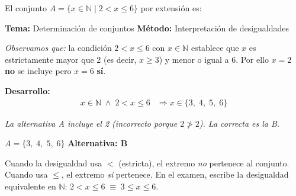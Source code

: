 \begin{tcolorbox}[
  enhanced, breakable,
  colback=GrisClaro, colframe=AzulPizarra,
  fonttitle=\bfseries\sffamily,
  title={Ejercicio 3 --- Nivel B\'asico},
  arc=3pt, boxrule=0.8pt
]
\begin{problema}
  El conjunto $A = \{x \in \mathbb{N} \mid 2 < x \leq 6\}$ por extensi\'on es:
\end{problema}

\smallskip
\noindent
\textbf{\sffamily\color{AzulMedio}Tema:} Determinaci\'on de conjuntos
\hfill
\textbf{\sffamily\color{AzulMedio}M\'etodo:} Interpretaci\'on de desigualdades

\medskip
\noindent\textit{Observamos que:} la condici\'on $2 < x \leq 6$ con
$x \in \mathbb{N}$ establece que $x$ es estrictamente mayor que 2 (es decir,
$x \geq 3$) y menor o igual a 6. Por ello $x = 2$ \textbf{no} se incluye pero
$x = 6$ \textbf{sí}.

\medskip
\noindent\textbf{\sffamily Desarrollo:}
\begin{align*}
  x \in \mathbb{N} \;\wedge\; 2 < x \leq 6
  &\Rightarrow x \in \{3,\; 4,\; 5,\; 6\}
\end{align*}

\noindent\textit{La alternativa A incluye el 2 (incorrecto porque $2 \not> 2$).
La correcta es la B.}

\medskip
\begin{tcolorbox}[
  colback=AzulClaro!60, colframe=AzulPizarra,
  arc=2pt, boxrule=0.8pt, left=8pt, right=8pt
]
\centering
$\displaystyle \boxed{A = \{3,\;4,\;5,\;6\}}$ \quad
\textbf{Alternativa: B}
\end{tcolorbox}

\begin{cajatip}
  Cuando la desigualdad usa $<$ (estricta), el extremo \emph{no} pertenece al
  conjunto. Cuando usa $\leq$, el extremo \emph{sí} pertenece.
  En el examen, escribe la desigualdad equivalente en $\mathbb{N}$:
  $2 < x \leq 6 \;\equiv\; 3 \leq x \leq 6$.
\end{cajatip}
\end{tcolorbox}

\vspace{0.5cm}

